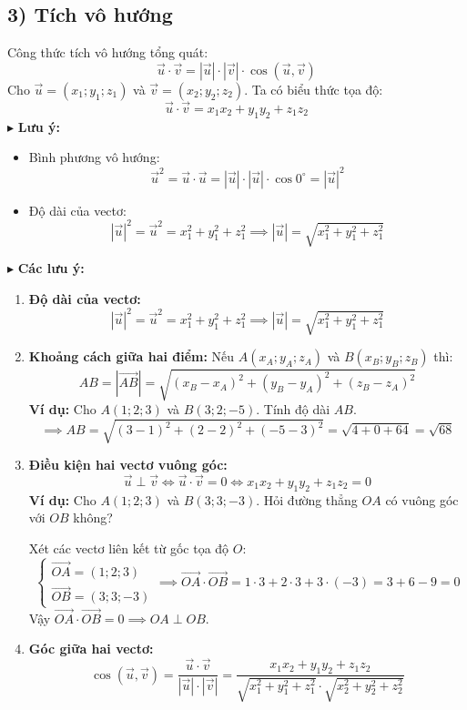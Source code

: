 \documentclass[12pt,a4paper]{extarticle}
\begin{document}
\subsection*{3) Tích vô hướng}
\noindent Công thức tích vô hướng tổng quát:
\[
\vec{u} \cdot \vec{v} = |\vec{u}| \cdot |\vec{v}| \cdot \cos(\vec{u}, \vec{v})
\]
\noindent Cho $\vec{u} = (x_1; y_1; z_1)$ và $\vec{v} = (x_2; y_2; z_2)$. Ta có biểu thức tọa độ:
\[
\vec{u} \cdot \vec{v} = x_1 x_2 + y_1 y_2 + z_1 z_2
\]
\vspace{1em}
\noindent $\blacktriangleright$ \textbf{Lưu ý:}
\begin{itemize}[leftmargin=*, label=$\circ$, itemsep=0.5em]
    \item Bình phương vô hướng:
    \[
    \vec{u}^2 = \vec{u} \cdot \vec{u} = |\vec{u}| \cdot |\vec{u}| \cdot \cos 0^\circ = |\vec{u}|^2
    \]
    \item Độ dài của vectơ:
    \[
    |\vec{u}|^2 = \vec{u}^2 = x_1^2 + y_1^2 + z_1^2 \implies \boxed{|\vec{u}| = \sqrt{x_1^2 + y_1^2 + z_1^2}}
    \]
\end{itemize}
\noindent $\blacktriangleright$ \textbf{Các lưu ý:}
\begin{enumerate}[leftmargin=*, label=\textbf{Lưu ý \arabic*.}, itemsep=1em]
    \item \textbf{Độ dài của vectơ:}
    \[
    |\vec{u}|^2 = \vec{u}^2 = x_1^2 + y_1^2 + z_1^2 \implies \boxed{|\vec{u}| = \sqrt{x_1^2 + y_1^2 + z_1^2}}
    \]
    
    \item \textbf{Khoảng cách giữa hai điểm:} Nếu $A(x_A; y_A; z_A)$ và $B(x_B; y_B; z_B)$ thì:
    \[
    AB = |\vec{AB}| = \sqrt{(x_B - x_A)^2 + (y_B - y_A)^2 + (z_B - z_A)^2}
    \]
    \textbf{Ví dụ:} Cho $A(1; 2; 3)$ và $B(3; 2; -5)$. Tính độ dài $AB$.
    \[
    \implies AB = \sqrt{(3-1)^2 + (2-2)^2 + (-5-3)^2} = \sqrt{4 + 0 + 64} = \sqrt{68}
    \]
    
    \item \textbf{Điều kiện hai vectơ vuông góc:}
    \[
    \vec{u} \perp \vec{v} \Leftrightarrow \vec{u} \cdot \vec{v} = 0 \Leftrightarrow x_1 x_2 + y_1 y_2 + z_1 z_2 = 0
    \]
    \textbf{Ví dụ:} Cho $A(1; 2; 3)$ và $B(3; 3; -3)$. Hỏi đường thẳng $OA$ có vuông góc với $OB$ không?
    \par Xét các vectơ liên kết từ gốc tọa độ $O$:
    \[
    \begin{cases}
        \vec{OA} = (1; 2; 3) \\
        \vec{OB} = (3; 3; -3)
    \end{cases}
    \implies \vec{OA} \cdot \vec{OB} = 1 \cdot 3 + 2 \cdot 3 + 3 \cdot (-3) = 3 + 6 - 9 = 0
    \]
    Vậy $\vec{OA} \cdot \vec{OB} = 0 \implies OA \perp OB$.

    \item \textbf{Góc giữa hai vectơ:}
    \[
    \cos(\vec{u}, \vec{v}) = \frac{\vec{u} \cdot \vec{v}}{|\vec{u}| \cdot |\vec{v}|} = \frac{x_1 x_2 + y_1 y_2 + z_1 z_2}{\sqrt{x_1^2 + y_1^2 + z_1^2} \cdot \sqrt{x_2^2 + y_2^2 + z_2^2}}
    \]
\end{enumerate}
\end{document}
